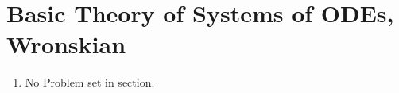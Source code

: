 \section{Basic Theory of Systems of ODEs, Wronskian}

\begin{enumerate}
    \item No Problem set in section.
\end{enumerate}
